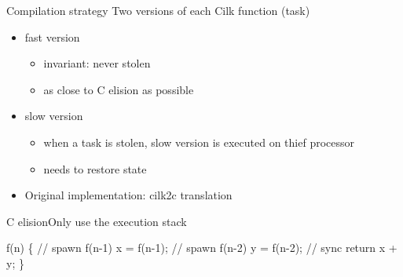 \documentclass[13pt]{beamer}
\begin{document}
\begin{frame}{Compilation strategy}{}
Two versions of each Cilk function (task)
\begin{itemize}
    \item fast version
    \begin{itemize}
        \item invariant: never stolen
        \item as close to C elision as possible
    \end{itemize}

    \item slow version
    \begin{itemize}
        \item when a task is stolen, slow version is executed on thief processor
        \item needs to restore state
    \end{itemize}

    \item Original implementation: cilk2c translation
\end{itemize}
\end{frame}

\begin{frame}[fragile]{C elision}{Only use the execution stack}
\begin{semiverbatim}{\small
f(n) \{
    // spawn f(n-1)
    x = f(n-1);
    // spawn f(n-2)
    y = f(n-2);
    // sync
    return x + y;
\}
}\end{semiverbatim}
\end{frame}
\end{document}
